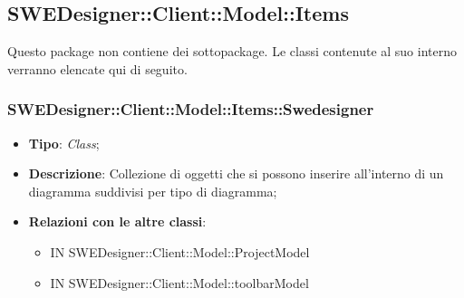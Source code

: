\documentclass[../DefinizioneDiProdotto.tex]{subfiles}
\begin{document}
			\subsection{SWEDesigner::Client::Model::Items}
			\hypertarget{SWEDesigner::Client::Model::Items}{}
			Questo package non contiene dei sottopackage. Le classi contenute al suo interno verranno
			elencate qui di seguito.
			
			\subsubsection{SWEDesigner::Client::Model::Items::Swedesigner}
			\hypertarget{SWEDesigner::Client::Model::Items::Swedesigner}{}
			\begin{itemize}
				\item \textbf{Tipo}: \emph{Class};
				\item \textbf{Descrizione}: Collezione di oggetti che si possono inserire all'interno di un diagramma suddivisi per tipo di diagramma;
				\item \textbf{Relazioni con le altre classi}:
				\begin{itemize}
					\item IN SWEDesigner::Client::Model::ProjectModel
					\item IN SWEDesigner::Client::Model::toolbarModel
				\end{itemize}
			\end{itemize}
			
			
\end{document}
